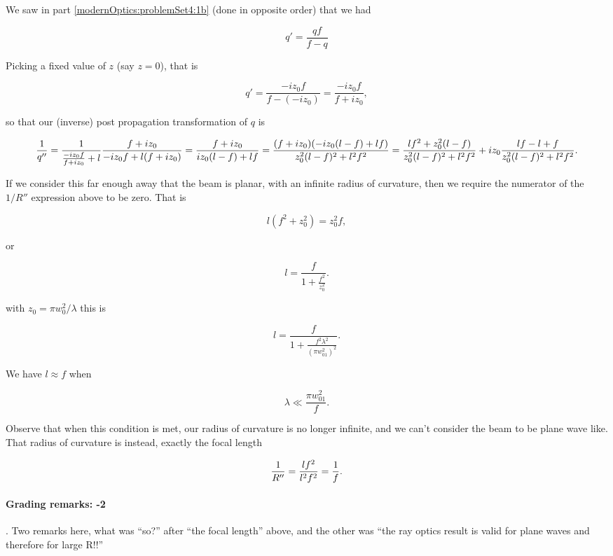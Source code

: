 {We saw in part \ref{modernOptics:problemSet4:1b} (done in opposite order) that we had

\begin{dmath}\label{eqn:problemSet4Problem1:360}
q' = \frac{q f}{f - q}
\end{dmath}

Picking a fixed value of $z$ (say $z = 0$), that is

\begin{dmath}\label{eqn:problemSet4Problem1:380}
q' = \frac{- i z_0 f}{ f - (-i z_0)} = \frac{-i z_0 f}{f + i z_0},
\end{dmath}

so that our (inverse) post propagation transformation of $q$ is

\begin{dmath}\label{eqn:problemSet4Problem1:400}
\inv{q''} =
\frac{1}{
\frac{-i z_0 f}{f + i z_0}
+ l
}
\frac{f + i z_0}{
-i z_0 f + l (f + i z_0)
}
=
\frac{f + i z_0}{
i z_0 ( l - f ) + l f
}
=
\frac{(f + i z_0)(
-i z_0 ( l - f ) + l f
)}{
z_0^2 ( l - f )^2 + l^2 f^2
}
=
\frac{
l f^2 + z_0^2 ( l - f)
}{
z_0^2 ( l - f )^2 + l^2 f^2
}
+
i z_0
\frac{
l f - l + f
}{
z_0^2 ( l - f )^2 + l^2 f^2
}.
\end{dmath}

If we consider this far enough away that the beam is planar, with an infinite radius of curvature, then we require the numerator of the $1/R''$ expression above to be zero.  That is

\begin{dmath}\label{eqn:problemSet4Problem1:420}
l ( f^2 + z_0^2 ) = z_0^2 f,
\end{dmath}

or

\begin{dmath}\label{eqn:problemSet4Problem1:440}
l
= \frac{f}{1 + \frac{f^2}{z_0^2} }.
\end{dmath}

with $z_0 = \pi w_0^2/\lambda$ this is

\begin{dmath}\label{eqn:problemSet4Problem1:460}
\boxed{
l
= \frac{f}{1 + \frac{f^2 \lambda^2}{\left(\pi w_{01}^2\right)^2} }.
}
\end{dmath}

We have $l \approx f$ when

\begin{dmath}\label{eqn:problemSet4Problem1:480}
\boxed{
\lambda \ll \frac{\pi w_{01}^2}{f}.
}
\end{dmath}

Observe that when this condition is met, our radius of curvature is no longer infinite, and we can't consider the beam to be plane wave like.  That radius of curvature is instead, exactly the focal length

\begin{dmath}\label{eqn:problemSet4Problem1:500}
\inv{R''} = \frac{l f^2}{ l^2 f^2} = \inv{f}.
\end{dmath}
}

\paragraph{Grading remarks: -2}.  Two remarks here, what was ``so?'' after ``the focal length'' above, and the other was ``the ray optics result is valid for plane waves and therefore for large R!!''
